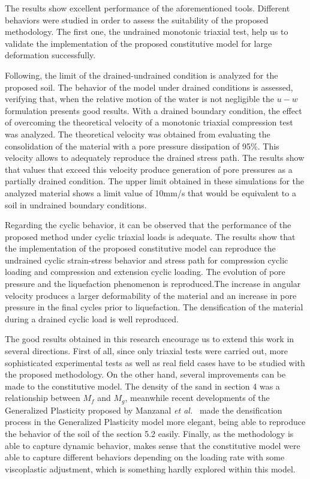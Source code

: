 \documentclass[preprint,12pt,a4paper]{elsarticle}
\begin{document}
The results show excellent performance of the aforementioned tools. Different behaviors were studied in order to assess the suitability of the proposed methodology. The first one, the undrained monotonic triaxial test, help us to validate the implementation of the proposed constitutive model for large deformation successfully.

Following, the limit of the drained-undrained condition is analyzed for the proposed soil. The behavior of the model under drained conditions is assessed, verifying that, when the relative motion of the water is not negligible the $u-w$ formulation presents good results. With a drained boundary condition, the effect of overcoming the theoretical velocity of a monotonic triaxial compression test was analyzed. The theoretical velocity was obtained from evaluating the consolidation of the material with a pore pressure dissipation of 95\%. This velocity allows to adequately reproduce the drained stress path. The results show that values that exceed this velocity produce generation of pore pressures as a partially drained condition. The upper limit obtained in these simulations for the analyzed material shows a limit value of 10mm/s that would be equivalent to a soil in undrained boundary conditions.

Regarding the cyclic behavior, it can be observed that the performance of the proposed method under cyclic triaxial loads is adequate. The results show that the implementation of the proposed constitutive model can reproduce the undrained cyclic strain-stress behavior and stress path for compression cyclic loading and compression and extension cyclic loading. The evolution of pore pressure and the liquefaction phenomenon is reproduced.The increase in angular velocity produces a larger deformability of the material and an increase in pore pressure in the final cycles  prior to liquefaction. The densification of the material during a drained cyclic load is well reproduced.

The good results obtained in this research encourage us to extend this work in several directions. First of all, since only triaxial tests were carried out, more sophisticated experimental tests as well as real field cases have to be studied with the proposed methodology. On the other hand, several improvements can be made to the constitutive model. The density of the sand in section 4 was a relationship between $M_f$ and $M_g$, meanwhile recent developments of the Generalized Plasticity proposed by Manzanal \textit{et al.}~\cite{Manzanal2011,Manzanal2011a} made the densification process in the Generalized Plasticity model more elegant, being able to reproduce the behavior of the soil of the section 5.2 easily. Finally, as the methodology is able to capture dynamic behavior, makes sense that the constitutive model were able to capture different behaviors depending on the loading rate with some viscoplastic adjustment, which is something hardly explored within this model. 
\end{document}
